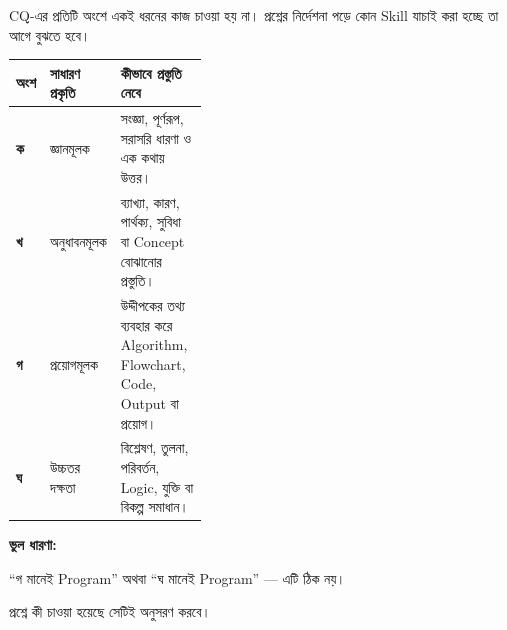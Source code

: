 
\begin{definitionbox}

CQ-এর প্রতিটি অংশে একই ধরনের কাজ চাওয়া হয় না। প্রশ্নের নির্দেশনা পড়ে
কোন Skill যাচাই করা হচ্ছে তা আগে বুঝতে হবে।

\end{definitionbox}

\begin{tabularx}{\linewidth}{
|C{0.10\linewidth}
|L{0.28\linewidth}
|Y|
}
\hline

\textbf{\color{darkTeal}অংশ}
&
\textbf{\color{darkTeal}সাধারণ প্রকৃতি}
&
\textbf{\color{darkTeal}কীভাবে প্রস্তুতি নেবে}
\\
\hline

\textbf{ক}
&
জ্ঞানমূলক
&
সংজ্ঞা, পূর্ণরূপ, সরাসরি ধারণা ও এক কথায় উত্তর।
\\
\hline

\textbf{খ}
&
অনুধাবনমূলক
&
ব্যাখ্যা, কারণ, পার্থক্য, সুবিধা বা Concept বোঝানোর প্রস্তুতি।
\\
\hline

\textbf{গ}
&
প্রয়োগমূলক
&
উদ্দীপকের তথ্য ব্যবহার করে Algorithm, Flowchart, Code, Output বা প্রয়োগ।
\\
\hline

\textbf{ঘ}
&
উচ্চতর দক্ষতা
&
বিশ্লেষণ, তুলনা, পরিবর্তন, Logic, যুক্তি বা বিকল্প সমাধান।
\\
\hline

\end{tabularx}

\begin{rememberbox}

\textbf{\color{deepOrange}ভুল ধারণা:}

\begin{center}
“গ মানেই Program” অথবা “ঘ মানেই Program” — এটি ঠিক নয়।
\end{center}

প্রশ্নে কী চাওয়া হয়েছে সেটিই অনুসরণ করবে।

\end{rememberbox}


